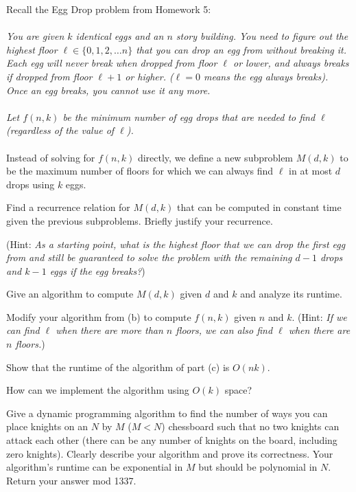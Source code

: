 \documentclass{article}
\begin{document}

Recall the Egg Drop problem from Homework 5:
\\\\
\textit{You are given $k$ identical eggs and an $n$ story
building. You need to figure out the highest floor
$\ell \in \{0, 1, 2, \ldots n\}$ that you can drop an egg from without
breaking it. Each egg will never break when dropped from floor $\ell$ or lower, and always breaks if dropped from floor $\ell+1$ or higher. ($\ell = 0$ means the egg always breaks). Once an egg breaks, you cannot use it any more. 
\\\\
Let $f(n, k)$ be the minimum number of egg drops that are needed to find $\ell$ (regardless of the value of $\ell$).}
\\\\
Instead of solving for $f(n, k)$ directly, we define a new subproblem $M(d, k)$ to be the maximum number of floors for which we can always find $\ell$ in at most $d$ drops using $k$ eggs.  

\begin{subparts}
\item  Find a recurrence relation for $M(d, k)$ that can be computed in constant time given the previous subproblems. Briefly justify your recurrence.

(Hint: \emph{As a starting point, what is the highest floor that we can drop the first egg from and still be guaranteed to solve the problem with the remaining $d-1$ drops and $k-1$ eggs if the egg breaks?})

\item  Give an algorithm to compute $M(d, k)$ given $d$ and $k$ and analyze its runtime. 

\item  Modify your algorithm from (b) to compute $f(n, k)$ given $n$ and $k$.  (Hint:  \textit{If we can find $\ell$ when there are more than $n$ floors, we can also find $\ell$ when there are $n$ floors.})

\item  Show that the runtime of the algorithm of part (c) is $O(nk)$.  

\item  How can we implement the algorithm using $O(k)$ space?
\end{subparts}

Give a dynamic programming algorithm to find the number of ways you can place knights on an $N$ by $M$ ($M < N$) chessboard such that no two knights can attack each other (there can be any number of knights on the board, including zero knights). Clearly describe your algorithm and prove its correctness. Your algorithm's runtime can be exponential in $M$ but should be polynomial in $N$. Return your answer mod 1337.
\end{document}
